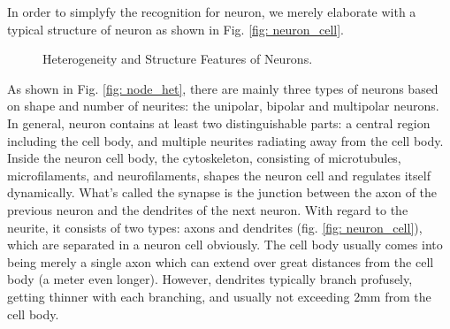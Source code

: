 \documentclass[journal,comsoc]{IEEEtran}
\begin{document}
				In order to simplyfy the recognition for neuron, we merely elaborate with a typical structure of neuron as shown in Fig. \ref{fig: neuron_cell}.
				\begin{figure}[htbp]
					\centering
					\caption{Heterogeneity and Structure Features of Neurons.}
				\end{figure}
				As shown in Fig. \ref{fig: node_het}, there are mainly three types of neurons based on shape and number of neurites: the unipolar, bipolar and multipolar neurons\cite{bear2007neuroscience}. 
				In general, neuron contains  at least two distinguishable parts: 
				a central region including the cell body, and multiple neurites radiating away from the cell body. 
				Inside the neuron cell body, the cytoskeleton, consisting of microtubules, microfilaments, and neurofilaments, shapes the neuron cell and regulates itself dynamically. 
				What's called the synapse is the junction between the axon of the previous neuron and the dendrites of the next neuron.
				With regard to the neurite, it consists of two types: axons and dendrites (fig. \ref{fig: neuron_cell}), which are separated in a neuron cell obviously.
				The cell body usually comes into being merely a single axon which can extend over great distances from the cell body (a meter even longer).
				However, dendrites typically branch profusely, getting thinner with each branching, and usually not exceeding 2mm from the cell body.
		
\end{document}
